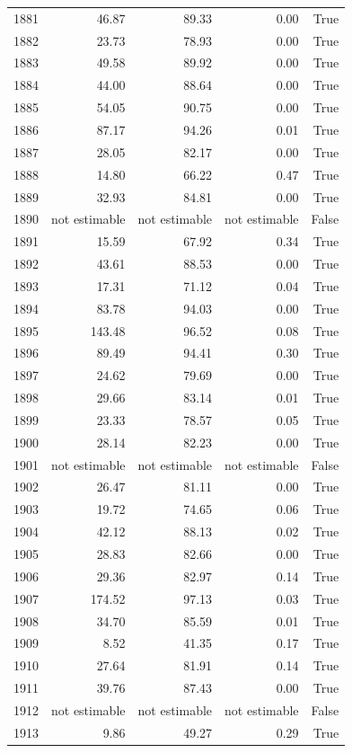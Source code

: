 \begin{longtable}{rrrrr}
1881 & 46.87 & 89.33 & 0.00 & True \\
1882 & 23.73 & 78.93 & 0.00 & True \\
1883 & 49.58 & 89.92 & 0.00 & True \\
1884 & 44.00 & 88.64 & 0.00 & True \\
1885 & 54.05 & 90.75 & 0.00 & True \\
1886 & 87.17 & 94.26 & 0.01 & True \\
1887 & 28.05 & 82.17 & 0.00 & True \\
1888 & 14.80 & 66.22 & 0.47 & True \\
1889 & 32.93 & 84.81 & 0.00 & True \\
1890 & not estimable & not estimable & not estimable & False \\
1891 & 15.59 & 67.92 & 0.34 & True \\
1892 & 43.61 & 88.53 & 0.00 & True \\
1893 & 17.31 & 71.12 & 0.04 & True \\
1894 & 83.78 & 94.03 & 0.00 & True \\
1895 & 143.48 & 96.52 & 0.08 & True \\
1896 & 89.49 & 94.41 & 0.30 & True \\
1897 & 24.62 & 79.69 & 0.00 & True \\
1898 & 29.66 & 83.14 & 0.01 & True \\
1899 & 23.33 & 78.57 & 0.05 & True \\
1900 & 28.14 & 82.23 & 0.00 & True \\
1901 & not estimable & not estimable & not estimable & False \\
1902 & 26.47 & 81.11 & 0.00 & True \\
1903 & 19.72 & 74.65 & 0.06 & True \\
1904 & 42.12 & 88.13 & 0.02 & True \\
1905 & 28.83 & 82.66 & 0.00 & True \\
1906 & 29.36 & 82.97 & 0.14 & True \\
1907 & 174.52 & 97.13 & 0.03 & True \\
1908 & 34.70 & 85.59 & 0.01 & True \\
1909 & 8.52 & 41.35 & 0.17 & True \\
1910 & 27.64 & 81.91 & 0.14 & True \\
1911 & 39.76 & 87.43 & 0.00 & True \\
1912 & not estimable & not estimable & not estimable & False \\
1913 & 9.86 & 49.27 & 0.29 & True \\

\end{longtable}
